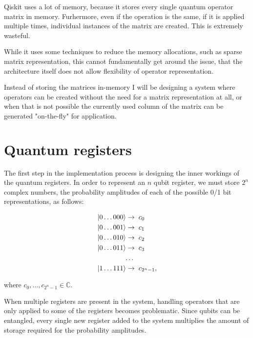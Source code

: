 Qiskit uses a lot of memory, because it stores every single quantum operator matrix in memory. Furhermore, even if the operation is the same, if it is applied multiple times, individual instances of the matrix are created. This is extremely wasteful.

While it uses some techniques to reduce the memory allocations, such as sparse matrix representation, this cannot fundamentally get around the issue, that the architecture itself does not allow flexibility of operator representation.

Instead of storing the matrices in-memory I will be designing a system where operators can be created without the need for a matrix representation at all, or when that is not possible the currently used column of the matrix can be generated "on-the-fly" for application.

\section{Quantum registers}

The first step in the implementation process is designing the inner workings of the quantum registers. In order to represent an $n$ qubit register, we must store $2^n$ complex numbers, the probability amplitudes of each of the possible 0/1 bit representations, as follows:

\begin{align*}
\ket{0\dots{}000} \rightarrow & \hspace{2mm} c_0 \\
\ket{0\dots{}001} \rightarrow & \hspace{2mm}  c_1 \\
\ket{0\dots{}010} \rightarrow & \hspace{2mm} c_2 \\
\ket{0\dots{}011} \rightarrow & \hspace{2mm} c_3 \\
\dots{} \\
\ket{1\dots{}111} \rightarrow & \hspace{2mm} c_{2^n-1},
\end{align*}

where $c_0,\dots{},c_{2^n-1}\in{}\mathds{C}$.

When multiple registers are present in the system, handling operators that are only applied to some of the registers becomes problematic. Since qubits can be entangled, every single new register added to the system multiplies the amount of storage required for the probability amplitudes.

